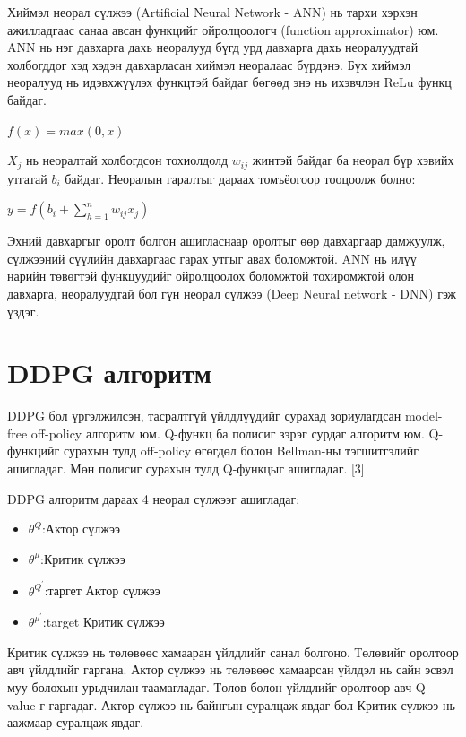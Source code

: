 \documentclass[12pt,A4]{report}
\begin{document}
Хиймэл неорал сүлжээ (Artificial Neural Network - ANN) нь тархи хэрхэн ажилладгаас санаа авсан функцийг ойролцоологч (function approximator) юм. ANN нь нэг давхарга дахь неоралууд бүгд урд давхарга дахь неоралуудтай холбогддог хэд хэдэн давхарласан хиймэл неоралаас бүрдэнэ. Бүх хиймэл неоралууд нь идэвхжүүлэх функцтэй байдаг бөгөөд энэ нь ихэвчлэн ReLu функц байдаг. 

\begin{center}
$f(x)=max(0, x)$
\end{center}

$X_j$ нь неоралтай холбогдсон тохиолдолд $w_{ij}$ жинтэй байдаг ба неорал бүр хэвийх утгатай $b_i$ байдаг. Неоралын гаралтыг дараах томъёогоор тооцоолж болно:

\begin{center}
$y=f(b_i+\sum_{h=1}^{n}w_{ij} x_j)$
\end{center}

Эхний давхаргыг оролт болгон ашигласнаар оролтыг өөр давхаргаар дамжуулж, сүлжээний сүүлийн давхаргаас гарах утгыг авах боломжтой. ANN нь илүү нарийн төвөгтэй функцуудийг ойролцоолох боломжтой тохиромжтой олон давхарга, неоралуудтай бол гүн неорал сүлжээ (Deep Neural network - DNN) гэж үздэг. 

\section{DDPG алгоритм}

DDPG бол үргэлжилсэн, тасралтгүй үйлдлүүдийг сурахад зориулагдсан model-free off-policy алгоритм юм. Q-функц ба полисиг зэрэг сурдаг алгоритм юм. Q-функцийг сурахын тулд off-policy өгөгдөл болон Bellman-ны тэгшитгэлийг ашигладаг. Мөн полисиг сурахын тулд Q-функцыг ашигладаг.  [3]

DDPG алгоритм дараах 4 неорал сүлжээг ашигладаг:
\begin{itemize}
	\item ${\theta}^Q$:Актор сүлжээ
	\item ${\theta}^{\mu}$:Критик сүлжээ
	\item ${\theta}^{Q^{'}}$:таргет Актор сүлжээ
	\item ${\theta}^{{\mu}^{'}}$:target Критик сүлжээ
\end{itemize} 
 
Критик сүлжээ нь төлөвөөс хамааран үйлдлийг санал болгоно. Төлөвийг оролтоор авч үйлдлийг гаргана. Актор сүлжээ нь төлөвөөс хамаарсан үйлдэл нь сайн эсвэл муу болохын урьдчилан таамагладаг. Төлөв болон үйлдлийг оролтоор авч Q-value-г гаргадаг. Актор сүлжээ нь байнгын суралцаж явдаг бол Критик сүлжээ нь аажмаар суралцаж явдаг.
\end{document}
